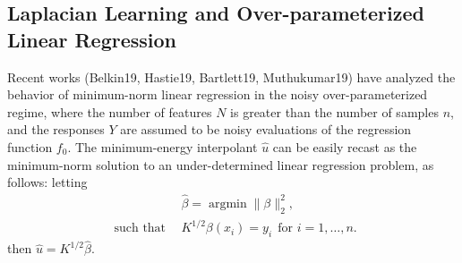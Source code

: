 \documentclass{article}
\newcommand{\1}{\mathbf{1}}
\DeclareMathOperator*{\argmin}{argmin}
\newcommand{\wh}[1]{\widehat{#1}}
\theoremstyle{definition}
\theoremstyle{remark}
\begin{document}
\subsection{Laplacian Learning and Over-parameterized Linear Regression}
Recent works (Belkin19, Hastie19, Bartlett19, Muthukumar19) have analyzed the behavior of minimum-norm linear regression in the noisy over-parameterized regime, where the number of features $N$ is greater than the number of samples $n$, and the responses $Y$ are assumed to be noisy evaluations of the regression function $f_0$. The minimum-energy interpolant $\wh{u}$ can be easily recast as the minimum-norm solution to an under-determined linear regression problem, as follows: letting
\begin{equation}
\begin{aligned}
& \wh{\beta} = \argmin \|\beta\|_2^2, \\
~~\textrm{such that} ~~& K^{1/2}\beta(x_i) = y_i~~\textrm{for~$i = 1,\ldots,n$.}
\end{aligned}
\end{equation}
then $\wh{u} = K^{1/2} \wh{\beta}$.
\end{document}

